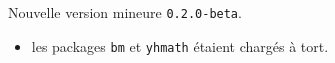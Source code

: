 Nouvelle version mineure \verb+0.2.0-beta+.

\begin{itemize}[itemsep=.5em]
    \item {}
          les packages \verb#bm# et \verb#yhmath# étaient chargés à tort.   
\end{itemize}

\separation
